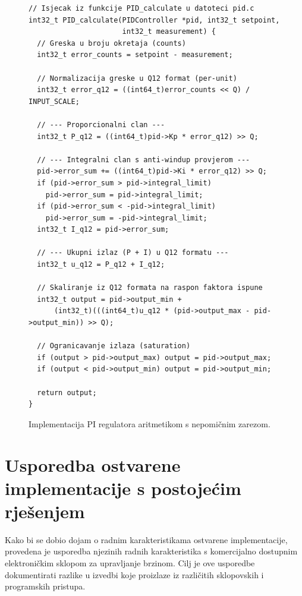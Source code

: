 \documentclass[diplomskirad]{fer}
\begin{document}
\begin{figure}[h!]
	\begin{verbatim}
// Isjecak iz funkcije PID_calculate u datoteci pid.c
int32_t PID_calculate(PIDController *pid, int32_t setpoint,
                      int32_t measurement) {
  // Greska u broju okretaja (counts)
  int32_t error_counts = setpoint - measurement;

  // Normalizacija greske u Q12 format (per-unit)
  int32_t error_q12 = ((int64_t)error_counts << Q) / INPUT_SCALE;

  // --- Proporcionalni clan ---
  int32_t P_q12 = ((int64_t)pid->Kp * error_q12) >> Q;

  // --- Integralni clan s anti-windup provjerom ---
  pid->error_sum += ((int64_t)pid->Ki * error_q12) >> Q;
  if (pid->error_sum > pid->integral_limit)
    pid->error_sum = pid->integral_limit;
  if (pid->error_sum < -pid->integral_limit)
    pid->error_sum = -pid->integral_limit;
  int32_t I_q12 = pid->error_sum;

  // --- Ukupni izlaz (P + I) u Q12 formatu ---
  int32_t u_q12 = P_q12 + I_q12;

  // Skaliranje iz Q12 formata na raspon faktora ispune
  int32_t output = pid->output_min + 
      (int32_t)(((int64_t)u_q12 * (pid->output_max - pid->output_min)) >> Q);

  // Ogranicavanje izlaza (saturation)
  if (output > pid->output_max) output = pid->output_max;
  if (output < pid->output_min) output = pid->output_min;

  return output;
}
\end{verbatim}
	\caption{Implementacija PI regulatora aritmetikom s nepomičnim zarezom.}
	\label{code:pi_impl}
\end{figure}


\chapter{Usporedba ostvarene implementacije s postojećim rješenjem}
\label{pog:usporedba}

Kako bi se dobio dojam o radnim karakteristikama ostvarene implementacije,
provedena je usporedba njezinih radnih karakteristika s komercijalno dostupnim
elektroničkim sklopom za upravljanje brzinom. Cilj je ove usporedbe
dokumentirati razlike u izvedbi koje proizlaze iz različitih sklopovskih i
programskih pristupa.
\end{document}
